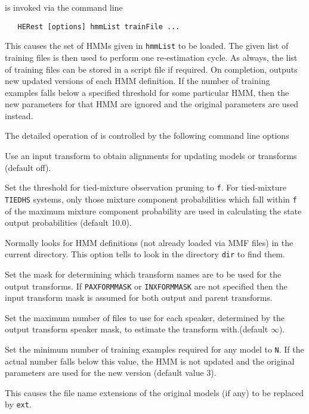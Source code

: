  is invoked via the command line
\begin{verbatim}
   HERest [options] hmmList trainFile ...
\end{verbatim}
This causes the set of HMMs given in {\tt hmmList} to be loaded.
The given list of
training files is then used to perform one re-estimation cycle. As always,
the list of training files can be stored in a script file if required.  On
completion,  outputs new updated versions of each HMM definition. If
the number of training examples falls below a specified threshold 
for some particular HMM, then
the new parameters for that HMM are ignored and the original parameters are used 
instead.

The detailed operation of  is controlled by the following
command line options
\begin{optlist}

   Use an input transform to obtain alignments for updating
      models or transforms (default off).
 
   Set the threshold for tied-mixture observation
      pruning to {\tt f}.
      For tied-mixture \texttt{TIEDHS} systems, only those 
      mixture component probabilities which fall within {\tt f} of
      the maximum mixture component probability are used in calculating
      the state output probabilities (default 10.0).
 
      Normally  looks for HMM definitions
       (not already loaded via MMF files) 
      in the current directory.  This option tells  to look in
      the directory {\tt dir} to find them.

   Set the mask for determining which transform names are 
	to be used for the output transforms. If \texttt{PAXFORMMASK}
       	or \texttt{INXFORMMASK} are not specified then the input
  	transform mask is assumed for both output and parent transforms.

   Set the maximum number of files to use for each 
	speaker, determined by the output transform speaker mask,
	to estimate the transform with.(default $\infty$).

    Set the minimum number of training examples 
    required for any model to {\tt N}.  If the actual number
    falls below this value, the HMM is not updated and the original
    parameters are used for the new version (default value 3).

    This causes the file name extensions of the
      original models (if any) to be replaced by {\tt ext}.


\end{optlist}
